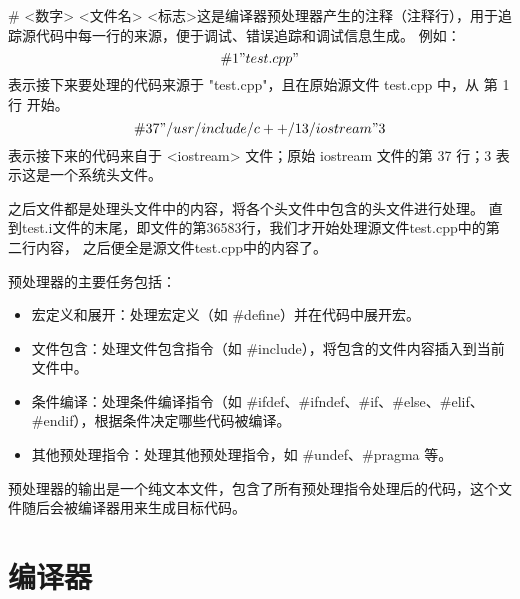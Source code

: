 \documentclass[UTF8,a4paper,10pt]{ctexart}
\begin{document}
\# <数字> <文件名> <标志>这是编译器预处理器产生的注释（注释行），用于追踪源代码中每一行的来源，便于调试、错误追踪和调试信息生成。
例如：$$\# 1 "test.cpp"$$表示接下来要处理的代码来源于 "test.cpp"，且在原始源文件 test.cpp 中，从 第 1 行 开始。
$$\# 37 "/usr/include/c++/13/iostream" 3$$表示接下来的代码来自于 <iostream> 文件；原始 iostream 文件的第 37 行；3 表示这是一个系统头文件。
\par
之后文件都是处理头文件中的内容，将各个头文件中包含的头文件进行处理。
直到test.i文件的末尾，即文件的第36583行，我们才开始处理源文件test.cpp中的第二行内容，
之后便全是源文件test.cpp中的内容了。
\par
预处理器的主要任务包括：
\begin{itemize}
  \item 宏定义和展开：处理宏定义（如 \#define）并在代码中展开宏。
  \item 文件包含：处理文件包含指令（如 \#include），将包含的文件内容插入到当前文件中。
  \item 条件编译：处理条件编译指令（如 \#ifdef、\#ifndef、\#if、\#else、\#elif、\#endif），根据条件决定哪些代码被编译。
  \item 其他预处理指令：处理其他预处理指令，如 \#undef、\#pragma 等。
\end{itemize}
\par
预处理器的输出是一个纯文本文件，包含了所有预处理指令处理后的代码，这个文件随后会被编译器用来生成目标代码。
\par

\section{编译器}
\end{document}
